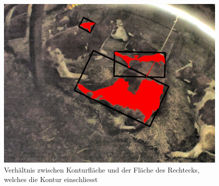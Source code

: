 \begin{figure}[H]
	\center
	\includegraphics[scale=0.43]{Grafiken/entwicklung/24ExtentDemonstration.jpg}
	\caption{Verhältnis zwischen Konturfläche und der Fläche des Rechtecks, welches die Kontur einschliesst } 
	\label{fig :Verhältnis zwischen Konturfläche und der Fläche des Rechtecks, welches die Kontur einschliesst} 
\end{figure}